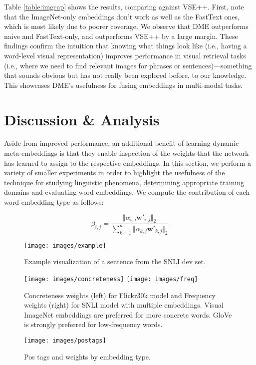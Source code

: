 \documentclass[11pt,a4paper]{article}
\begin{document}
Table \ref{table:imgcap} shows the results, comparing against VSE++. First, note that the ImageNet-only embeddings don't work as well as the FastText ones, which is most likely due to poorer coverage. We observe that DME outperforms naive and FastText-only, and outperforms VSE++ by a large margin. These findings confirm the intuition that knowing what things look like (i.e., having a word-level visual representation) improves performance in visual retrieval tasks (i.e., where we need to find relevant images for phrases or sentences)---something that sounds obvious but has not really been explored before, to our knowledge. This showcases DME's usefulness for fusing embeddings in multi-modal tasks.

\section{Discussion \& Analysis}
\label{sec:analysis}

Aside from improved performance, an additional benefit of learning dynamic meta-embeddings is that they enable inspection of the weights that the network has learned to assign to the respective embeddings. In this section, we perform a variety of smaller experiments in order to highlight the usefulness of the technique for studying linguistic phenomena, determining appropriate training domains and evaluating word embeddings. We compute the contribution of each word embedding type as follows:

\[
\beta_{i,j} = \frac{\Vert \alpha_{i,j} \mathbf{w'}_{i,j} \Vert_2}{\sum_{k=1}^n \Vert \alpha_{k,j} \mathbf{w'}_{k,j} \Vert_2}
\]

\begin{figure*}[t]
\centering
\texttt{[image: images/example]}
\caption{Example visualization of a sentence from the SNLI dev set.}
\label{fig:visualization-example}
\end{figure*}


\begin{figure*}[t]
\centering
\texttt{[image: images/concreteness]}
\texttt{[image: images/freq]}
\caption{Concreteness weights (left) for Flickr30k model and Frequency weights (right) for SNLI model with multiple embeddings. Visual ImageNet embeddings are preferred for more concrete words. GloVe is strongly preferred for low-frequency words.}
\label{fig:freq-and-conc}
\end{figure*}

\begin{figure}[t]
\centering
\texttt{[image: images/postags]}
\caption{Pos tags and weights by embedding type.}
\label{fig:postags}
\end{figure}
\end{document}
